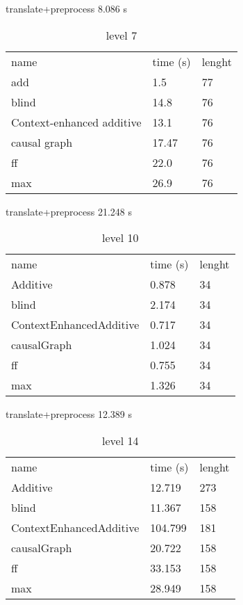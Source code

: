 	\begin{table}[h]
		\centering
		\caption{level 7}
		\label{tablvl7}
		translate+preprocess
		8.086 s\\
		\begin{tabular}{lll}
			
			name & time (s)& lenght\\
			add & 1.5 & 77\\
			blind & 14.8 & 76\\
			Context-enhanced additive & 13.1 & 76\\
			causal graph & 17.47 & 76\\
			ff & 22.0 & 76\\
			max & 26.9 & 76\\
		\end{tabular}
	\end{table}
	
	\begin{table}[h]
		\centering
		\caption{level 10}
		\label{tablvl10}
		translate+preprocess
		21.248 s\\
		\begin{tabular}{lll}
			
			
			name & time (s)& lenght\\
			Additive & 0.878 & 34\\
			blind & 2.174 & 34\\
			ContextEnhancedAdditive & 0.717 & 34\\
			causalGraph & 1.024 & 34\\
			ff & 0.755 & 34\\
			max & 1.326 & 34\\
		\end{tabular}
	\end{table}
	\begin{table}[h]
		\centering
		\caption{level 14}
		\label{prob4}
		translate+preprocess
		12.389 s\\
		\begin{tabular}{lll}
			
			
			name & time (s)& lenght\\
			Additive & 12.719 & 273\\
			blind & 11.367 & 158\\
			ContextEnhancedAdditive & 104.799 & 181\\
			causalGraph & 20.722 & 158\\
			ff & 33.153 & 158\\
			max & 28.949 & 158\\
		\end{tabular}
	\end{table}
	
